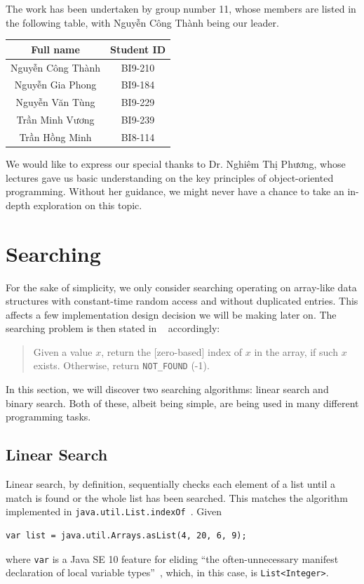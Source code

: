 \documentclass[a4paper,12pt]{article}
\begin{document}
The work has been undertaken by group number 11, whose members are listed
in the following table, with Nguyễn Công Thành being our leader.
\begin{center}
  \begin{tabular}{c c}
    \toprule
    Full name & Student ID\\
    \midrule
    Nguyễn Công Thành & BI9-210\\
    Nguyễn Gia Phong & BI9-184\\
    Nguyễn Văn Tùng & BI9-229\\
    Trần Minh Vương & BI9-239\\
    Trần Hồng Minh & BI8-114\\
    \bottomrule
  \end{tabular}
\end{center}

We would like to express our special thanks to Dr. Nghiêm Thị Phương,
whose lectures gave us basic understanding on the key principles of
object-oriented programming.  Without her guidance, we might never
have a chance to take an in-depth exploration on this topic.
\pagebreak

\section{Searching}
For the sake of simplicity, we only consider searching operating on array-like
data structures with constant-time random access and without duplicated entries.
This affects a few implementation design decision we will be making later on.
The searching problem is then stated in ~\cite[p.~634]{wu} accordingly:
\begin{quote}
  Given a value $x$, return the [zero-based] index of $x$ in the array,
  if such $x$ exists.  Otherwise, return \verb|NOT_FOUND| (-1).
\end{quote}

In this section, we will discover two searching algorithms: linear search
and binary search.  Both of these, albeit being simple, are being used in
many different programming tasks.

\subsection{Linear Search}
Linear search, by definition, sequentially checks each element of a list
until a match is found or the whole list has been searched.  This matches
the algorithm implemented in \verb|java.util.List.indexOf|~\cite[indexOf]{list}.
Given
\begin{verbatim}
var list = java.util.Arrays.asList(4, 20, 6, 9);
\end{verbatim}
where \verb|var| is a Java SE 10 feature for eliding ``the often-unnecessary
manifest declaration of local variable types''~\cite{var}, which, in this case,
is \verb|List<Integer>|.
\end{document}
